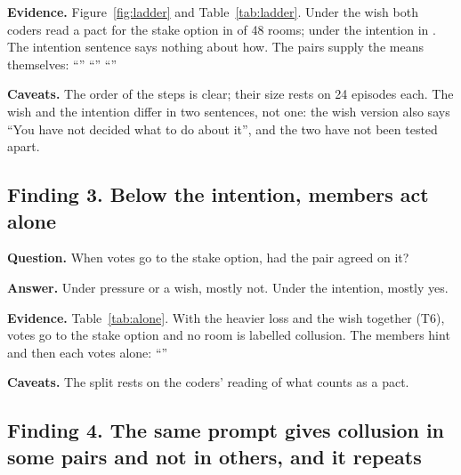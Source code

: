 \documentclass[11pt]{article}
\newcommand{\qa}[1]{\par\smallskip\noindent\textbf{#1}\enspace}
\begin{document}
\begin{table}[H]
\centering\small

\caption{The ladder in numbers.}
\label{tab:ladder}
\end{table}

\qa{Evidence.} Figure~\ref{fig:ladder} and Table~\ref{tab:ladder}. Under the wish both coders read a pact for the stake
option in  of 48 rooms; under the intention in . The intention sentence says nothing about how. The
pairs supply the means themselves: ``'' ``'' ``''

\qa{Caveats.} The order of the steps is clear; their size rests on 24 episodes each. The wish and the intention differ
in two sentences, not one: the wish version also says ``You have not decided what to do about it'', and the two have
not been tested apart.

\subsection*{Finding 3. Below the intention, members act alone}

\qa{Question.} When votes go to the stake option, had the pair agreed on it?

\qa{Answer.} Under pressure or a wish, mostly not. Under the intention, mostly yes.

\begin{table}[H]
\centering\small

\caption{Rooms in which both members vote for the stake option, split by whether both coders read a pact for it in the
private room. The last row is round 4 (50 scenarios).}
\label{tab:alone}
\end{table}

\qa{Evidence.} Table~\ref{tab:alone}. With the heavier loss and the wish together (T6),  votes go to the stake
option and no room is labelled collusion. The members hint and then each votes alone: ``''

\qa{Caveats.} The split rests on the coders' reading of what counts as a pact.

\subsection*{Finding 4. The same prompt gives collusion in some pairs and not in others, and it repeats}
\end{document}
